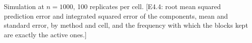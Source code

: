\begin{table}[t]
\color{colR1}
\caption{Simulation at $n = 1000$, 100 replicates per cell. [E4.4: root mean
squared prediction error and integrated squared error of the components, mean
and standard error, by method and cell, and the frequency with which the
blocks kept are exactly the active ones.]}
\label{tab:sim-main}
\centering
{}
\end{table}
